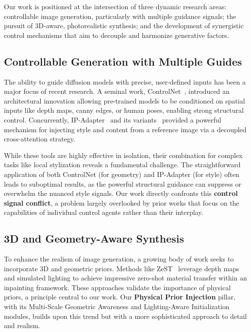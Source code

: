 \documentclass[letterpaper]{article} %
\begin{document}
Our work is positioned at the intersection of three dynamic research areas: controllable image generation, particularly with multiple guidance signals; the pursuit of 3D-aware, photorealistic synthesis; and the development of synergistic control mechanisms that aim to decouple and harmonize generative factors.

\subsection{Controllable Generation with Multiple Guides}

The ability to guide diffusion models with precise, user-defined inputs has been a major focus of recent research. A seminal work, ControlNet~\cite{zhang2023controlnet}, introduced an architectural innovation allowing pre-trained models to be conditioned on spatial inputs like depth maps, canny edges, or human poses, enabling strong structural control. Concurrently, IP-Adapter~\cite{ye2023ipadapter} and its variants~\cite{ipadapter_plus} provided a powerful mechanism for injecting style and content from a reference image via a decoupled cross-attention strategy. 

While these tools are highly effective in isolation, their combination for complex tasks like local stylization reveals a fundamental challenge. The straightforward application of both ControlNet (for geometry) and IP-Adapter (for style) often leads to suboptimal results, as the powerful structural guidance can suppress or overwhelm the nuanced style signals. Our work directly confronts this \textbf{control signal conflict}, a problem largely overlooked by prior works that focus on the capabilities of individual control agents rather than their interplay.

\subsection{3D and Geometry-Aware Synthesis}

To enhance the realism of image generation, a growing body of work seeks to incorporate 3D and geometric priors. Methods like ZeST~\cite{cheng2024zest} leverage depth maps and simulated lighting to achieve impressive zero-shot material transfer within an inpainting framework. These approaches validate the importance of physical priors, a principle central to our work. Our \textbf{Physical Prior Injection} pillar, with its Multi-Scale Geometric Awareness and Lighting-Aware Initialization modules, builds upon this trend but with a more sophisticated approach to detail and realism.
\end{document}
